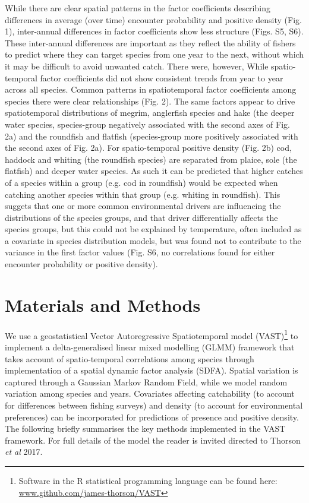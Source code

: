 \documentclass[12pt]{article}
\begin{document}
\begin{linenumbers}
While there are clear spatial patterns in the factor coefficients describing
differences in average (over time) encounter probability and positive density
(Fig. 1), inter-annual differences in factor coefficients show less structure
(Figs. S5, S6). These inter-annual differences are important as they reflect
the ability of fishers to predict where they can target species from one year
to the next, without which it may be difficult to avoid unwanted catch. There
were, however, While spatio-temporal factor coefficients did not show
consistent trends from year to year across all species. Common patterns in
spatiotemporal factor coefficients among species there were clear relationships
(Fig. 2).  The same factors appear to drive spatiotemporal distributions of
megrim, anglerfish species and hake (the deeper water species, species-group
negatively associated with the second axes of Fig. 2a) and the roundfish and
flatfish (species-group more positively associated with the second axes of Fig.
2a).  For spatio-temporal positive density (Fig. 2b) cod, haddock and whiting
(the roundfish species) are separated from plaice, sole (the flatfish) and
deeper water species.  As such it can be predicted that higher catches of a
species within a group (e.g.  cod in roundfish) would be expected when catching
another species within that group (e.g.  whiting in roundfish). This suggets
that one or more common environmental drivers are influencing the distributions
of the species groups, and that driver differentially affects the species
groups, but this could not be explained by temperature, often included as a
covariate in species distribution models, but was found not to contribute to
the variance in the first factor values (Fig. S6, no correlations found for
either encounter probability or positive density).


\section*{Materials and Methods}

We use a geostatistical Vector Autoregressive Spatiotemporal model
	(VAST)\footnote{Software in the R statistical programming language can
	be found here: \url{www.github.com/james-thorson/VAST}} to implement a
delta-generalised linear mixed modelling (GLMM) framework that takes account of
spatio-temporal correlations among species through implementation of a spatial
dynamic factor analysis (SDFA). Spatial variation is captured through a
Gaussian Markov Random Field, while we model random variation among species and
years. Covariates affecting catchability (to account for differences between
fishing surveys) and density (to account for environmental preferences) can be
incorporated for predictions of presence and positive density. The following
briefly summarises the key methods implemented in the VAST framework. For full
details of the model the reader is invited directed to Thorson \textit{et al}
2017\cite{Thorson2017}.


\end{linenumbers}
\end{document}
